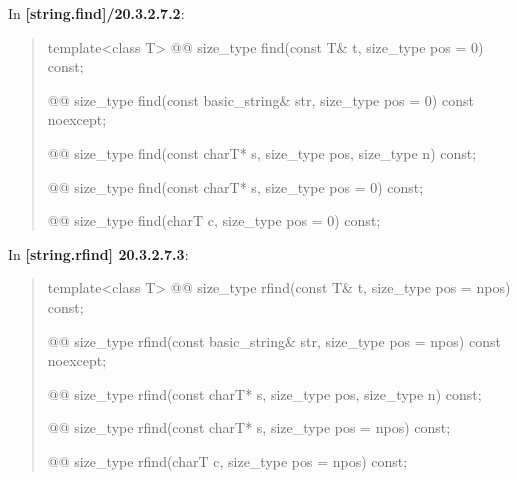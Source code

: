 \documentclass{wg21}
\begin{document}
In \textbf{[string.find]/20.3.2.7.2}:
\begin{quote}
\begin{itemdecl}
template<class T>
  @@ size_type find(const T& t, size_type pos = 0) const;
\end{itemdecl}

\begin{itemdecl}
@@ size_type find(const basic_string& str, size_type pos = 0) const noexcept;
\end{itemdecl}

\begin{itemdecl}
@@ size_type find(const charT* s, size_type pos, size_type n) const;
\end{itemdecl}

\begin{itemdecl}
@@ size_type find(const charT* s, size_type pos = 0) const;
\end{itemdecl}

\begin{itemdecl}
@@ size_type find(charT c, size_type pos = 0) const;
\end{itemdecl}
\end{quote}


In \textbf{[string.rfind] 20.3.2.7.3}:
\begin{quote}
\begin{itemdecl}
template<class T>
  @@ size_type rfind(const T& t, size_type pos = npos) const;
\end{itemdecl}

\begin{itemdecl}
@@ size_type rfind(const basic_string& str, size_type pos = npos) const noexcept;
\end{itemdecl}

\begin{itemdecl}
@@ size_type rfind(const charT* s, size_type pos, size_type n) const;
\end{itemdecl}

\begin{itemdecl}
@@ size_type rfind(const charT* s, size_type pos = npos) const;
\end{itemdecl}

\begin{itemdecl}
@@ size_type rfind(charT c, size_type pos = npos) const;
\end{itemdecl}
\end{quote}
\end{document}
